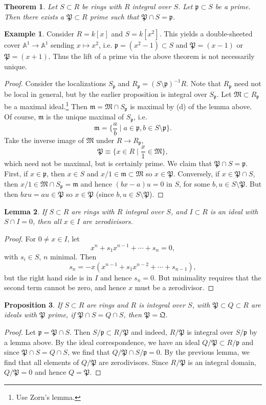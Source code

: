 \documentclass{article}
\newcommand{\fr}{\mathfrak}
\newcommand{\A}{\mathbb{A}}
\theoremstyle{plain}
\newtheorem{thm}{Theorem}
\newtheorem{lem}[thm]{Lemma}
\newtheorem{prop}[thm]{Proposition}
\theoremstyle{definition}
\newtheorem{exmp}{Example}
\theoremstyle{remark}
\begin{document}
\begin{thm}
    Let $S\subset R$ be rings with $R$ integral over $S$. Let $\fr p\subset S$ be a prime.
    Then there exists a $\fr P\subset R$ prime such that $\fr P\cap S=\fr p$.
\end{thm} 

\begin{exmp}
    Consider $R=k[x]$ and $S=k[x^2]$. This yields a double-sheeted cover $\A^1\to\A^1$ sending $x\mapsto x^2$,
    i.e. $\fr p=(x^2-1)\subset S$ and $\fr P=(x-1)$ or $\fr P=(x+1)$. Thus the lift of a prime
    via the above theorem is not necessarily unique.
\end{exmp}

\begin{proof}
    Consider the localizations $S_{\fr p}$ and $R_{\fr p}=(S\setminus\fr p)^{-1}R$.
    Note that $R_{\fr p}$ need not be local in general, but by the earlier proposition
    is integral over $S_{\fr p}$. Let $\fr M\subset R_{\fr p}$ be a maximal ideal.\footnote{Use Zorn's lemma.}
    Then $\fr m=\fr M\cap S_{\fr p}$ is maximal by (d) of the lemma above. Of course, $\fr m$
    is the unique maximal of $S_{\fr p}$, i.e.
    \[\fr m=\{\frac{a}{b}\mid a\in\fr p,b\in S\setminus\fr p\}.\]
    Take the inverse image of $\fr M$ under $R\to R_{\fr p}$,
    \[\fr P\equiv\{x\in R\mid \frac{x}{1}\in\fr M\},\]
    which need not be maximal, but is certainly prime. We claim that $\fr P\cap S=\fr p$.
    First, if $x\in\fr p$, then $x\in S$ and $x/1\in\fr m\subset\fr M$ so $x\in\fr P$.
    Conversely, if $x\in \fr P\cap S$, then $x/1\in\fr M\cap S_{\fr p}=\fr m$ and hence
    $(bx-a)u=0$ in $S$, for some $b,u\in S\setminus\fr P$. But then $bxu=au\in\fr P$ so
    $x\in\fr P$ (since $b,u\in S\setminus\fr P$).
\end{proof}

\begin{lem}
    If $S\subset R$ are rings with $R$ integral over $S$, and $I\subset R$ is an ideal
    with $S\cap I=0$, then all $x\in I$ are zerodivisors.
\end{lem}
\begin{proof}
    For $0\neq x\in I$, let
    \[x^n+s_1x^{n-1}+\cdots + s_n=0,\]
    with $s_i\in S$, $n$ minimal. Then
    \[s_n=-x(x^{n-1}+s_1x^{n-2}+\cdots+s_{n-1}),\]
    but the right hand side is in $I$ and hence $s_n=0$. But minimality requires that
    the second term cannot be zero, and hence $x$ must be a zerodivisor.
\end{proof}

\begin{prop}
    If $S\subset R$ are rings and $R$ is integral over $S$, with $\fr P\subset Q\subset R$
    are ideals with $\fr P$ prime, if $\fr P\cap S=Q\cap S$, then $\fr P=\fr Q$.
\end{prop}
\begin{proof}
    Let $\fr p=\fr P\cap S$. Then $S/\fr p\subset R/\fr P$ and indeed, $R/\fr P$ is integral
    over $S/\fr p$ by a lemma above. By the ideal correspondence, we have an ideal
    $Q/\fr P\subset R/\fr p$ and since $\fr P\cap S=Q\cap S$, we find that $Q/\fr P\cap S/\fr p=0$.
    By the previous lemma, we find that all elements of $Q/\fr P$ are zerodivisors. Since
    $R/\fr P$ is an integral domain, $Q/\fr P=0$ and hence $Q=\fr P$.
\end{proof}
\end{document}
